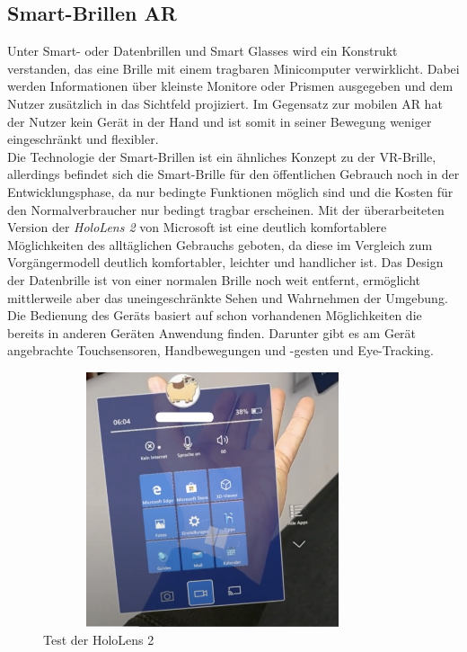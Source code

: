 \subsection*{Smart-Brillen AR}
Unter Smart- oder Datenbrillen und Smart Glasses wird ein Konstrukt verstanden, das eine Brille mit einem tragbaren Minicomputer verwirklicht. 
Dabei werden Informationen über kleinste Monitore oder Prismen ausgegeben und dem Nutzer zusätzlich in das Sichtfeld projiziert. Im Gegensatz
zur mobilen \acs{AR} hat der Nutzer kein Gerät in der Hand und ist somit in seiner Bewegung weniger eingeschränkt und flexibler. 
\\ 
\linebreak
Die Technologie der Smart-Brillen ist ein ähnliches Konzept zu der \acs{VR}-Brille, allerdings befindet sich die Smart-Brille für den 
öffentlichen Gebrauch noch in der Entwicklungsphase, da nur bedingte Funktionen möglich sind und die Kosten für den Normalverbraucher nur 
bedingt tragbar erscheinen. Mit der überarbeiteten Version der \textit{HoloLens 2} von Microsoft ist eine deutlich komfortablere 
Möglichkeiten des alltäglichen Gebrauchs geboten, da diese im Vergleich zum Vorgängermodell deutlich komfortabler, leichter und 
handlicher ist. Das Design der Datenbrille ist von einer normalen Brille noch weit entfernt, ermöglicht mittlerweile aber das 
uneingeschränkte Sehen und Wahrnehmen der Umgebung. Die Bedienung des Geräts basiert auf schon vorhandenen Möglichkeiten die bereits in anderen 
Geräten Anwendung finden. Darunter gibt es am Gerät angebrachte Touchsensoren, Handbewegungen und -gesten und Eye-Tracking. 
\begin{figure}[hbt!]
    \centering
    \includegraphics[width=10cm,height=7.5cm,keepaspectratio]{2Grundlagen/Bilder/smartglassAW.png}
    \caption{Test der HoloLens 2}
    \label{pic:testholo}
\end{figure}
